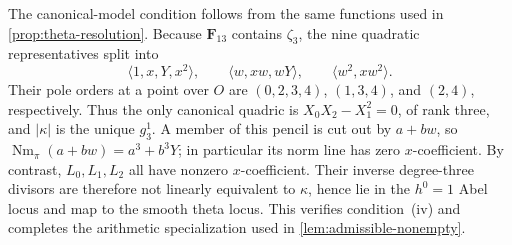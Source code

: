 \documentclass[10pt]{amsart}
\numberwithin{equation}{section}
\theoremstyle{definition}
\theoremstyle{remark}
\newcommand{\Nm}{\operatorname{Nm}}
\begin{document}
The canonical-model condition follows from the same functions used in
\cref{prop:theta-resolution}.  Because $\mathbf F_{13}$ contains $\zeta_3$,
the nine quadratic
representatives split into
\[
 \langle1,x,Y,x^2\rangle,\qquad
 \langle w,xw,wY\rangle,\qquad
 \langle w^2,xw^2\rangle.
\]
Their pole orders at a point over $O$ are $(0,2,3,4)$, $(1,3,4)$, and
$(2,4)$, respectively.  Thus the only canonical quadric is
$X_0X_2-X_1^2=0$, of rank three, and $|\kappa|$ is the unique $g^1_3$.
A member of this pencil is cut out by $a+bw$, so
$\Nm_\pi(a+bw)=a^3+b^3Y$; in particular its norm line has zero
$x$-coefficient.  By contrast, $L_0,L_1,L_2$ all have nonzero
$x$-coefficient.  Their inverse degree-three
divisors are therefore not linearly equivalent to $\kappa$, hence lie in the
$h^0=1$ Abel locus and map to the smooth theta locus.  This verifies
condition~(iv) and completes the arithmetic specialization used in
\cref{lem:admissible-nonempty}.
\end{document}
